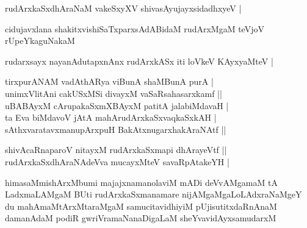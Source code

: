 \begin{entry}
\begin{shl}
rudArxkaSxdhAraNaM vakeSxyXV shivasAyujayxsidadhxyeV |
\end{shl}
\end{entry}

\begin{entry}
\gl{}
\begin{shl}
cidujavxlana shakitxvishiSaTxparxsAdABidaM rudArxMgaM teVjoV\\
rUpeYkaguNakaM
\end{shl}
\end{entry}

\begin{entry}
\begin{shl}
rudarxsayx nayanAdutapxnAnx rudArxkASx iti loVkeV KAyxyaMteV |
\end{shl}
\begin{shl}
tirxpurANAM vadAthARya viBunA shaMBunA purA |\\
unimxVlitAni cakUSxMSi divayxM vaSaRsahasarxkamf ||\\
uBABAyxM cArupakaSxmXBAyxM patitA jalabiMdavaH |\\
ta Eva biMdavoV jAtA mahArudArxkaSxvaqkaSxkAH |\\
sAthxvaratavxmanupArxpuH BakAtxnugarxhakAraNAtf ||
\end{shl}
\begin{shl}
shivAcaRnaparoV nitayxM rudArxkaSxmapi dhArayeVtf ||\\
rudArxkaSxdhAraNAdeVva mucayxMteV savaRpAtakeYH |
\end{shl}

\gl{}
\begin{shl}
himasaMmishArxMbumi majajxnamanolaviM mADi deVvAMgamaM tA\\
LadxmaLAMgaM BUti rudArxkaSxmanamare nijAMgaMgaLoLAdxraNaMgeY\\
du mahAmaMtArxMtaraMgaM samucitavidhiyiM pUjisutitxdaRnAnaM\\
damanAdaM podiR gwriVramaNanaDigaLaM sheYvavidAyxsamudarxM
\end{shl}
\end{entry}
